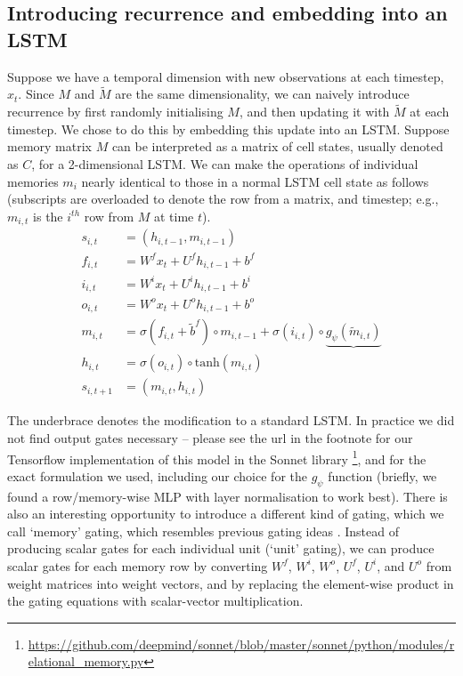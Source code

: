 \documentclass{article}
\begin{document}
\subsection{Introducing recurrence and embedding into an LSTM}
Suppose we have a temporal dimension with new observations at each timestep, $x_t$. Since $M$ and $\widetilde{M}$ are the same dimensionality, we can naively introduce recurrence by first randomly initialising $M$, and then updating it with $\widetilde{M}$ at each timestep. We chose to do this by embedding this update into an LSTM. Suppose memory matrix $M$ can be interpreted as a matrix of cell states, usually denoted as $C$, for a 2-dimensional LSTM. We can make the operations of individual memories $m_i$ nearly identical to those in a normal LSTM cell state as follows (subscripts are overloaded to denote the row from a matrix, and timestep; e.g., $m_{i, t}$ is the $i^{th}$ row from $M$ at time $t$).
\begin{align}
    s_{i, t} &= (h_{i, t-1}, m_{i, t-1}) \\
    f_{i, t} &= W^f x_t + U^f h_{i, t-1} + b^f \\
    i_{i, t} &= W^i x_t + U^i h_{i, t-1} + b^i \\
    o_{i, t} &= W^o x_t + U^o h_{i, t-1} + b^o \\
    m_{i, t} &= \sigma(f_{i,t} + \tilde{b}^{f}) \circ m_{i, t-1} + \sigma(i_{i, t}) \circ \underbrace{{g_{\psi}(\widetilde{m}_{i,t})}} \\
    h_{i, t} &= \sigma(o_{i, t}) \circ \text{tanh}(m_{i, t}) \\
    s_{i, t+1} &= (m_{i, t}, h_{i, t})
\end{align}

The underbrace denotes the modification to a standard LSTM. In practice we did not find output gates necessary -- please see the url in the footnote for our Tensorflow implementation of this model in the Sonnet library \footnote{\url{https://github.com/deepmind/sonnet/blob/master/sonnet/python/modules/relational_memory.py}}, and for the exact formulation we used, including our choice for the $g_{\psi}$ function (briefly, we found a row/memory-wise MLP with layer normalisation to work best). There is also an interesting opportunity to introduce a different kind of gating, which we call `memory' gating, which resembles previous gating ideas \cite{gers1999learning, hochreiter1998lstm}. Instead of producing scalar gates for each individual unit (`unit' gating), we can produce scalar gates for each memory row by converting $W^f$, $W^i$, $W^o$, $U^f$, $U^i$, and $U^o$ from weight matrices into weight vectors, and by replacing the element-wise product in the gating equations with scalar-vector multiplication. 
\end{document}
